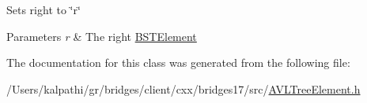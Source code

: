 Sets right to \char`\"{}r\char`\"{}


\begin{DoxyParams}{Parameters}
{\em r} & The right \mbox{\hyperlink{classbridges_1_1_b_s_t_element}{B\+S\+T\+Element}} \\
\hline
\end{DoxyParams}


The documentation for this class was generated from the following file\+:\begin{DoxyCompactItemize}
\item 
/\+Users/kalpathi/gr/bridges/client/cxx/bridges17/src/\mbox{\hyperlink{_a_v_l_tree_element_8h}{A\+V\+L\+Tree\+Element.\+h}}\end{DoxyCompactItemize}
